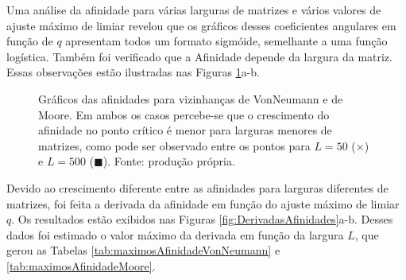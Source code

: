 \documentclass[
	12pt,				%
	openright,			%
	twoside,			%
	a4paper,			%
	english,			%
	french,				%
	spanish,			%
	brazil				%
	]{abntex2}
\begin{document}
Uma análise da afinidade para várias larguras de matrizes e vários valores de ajuste máximo de limiar revelou que os gráficos desses coeficientes angulares em função de $q$ apresentam todos um formato sigmóide, semelhante a uma função logística. Também foi verificado que a Afinidade depende da largura da matriz. Essas observações estão ilustradas nas Figuras \ref{fig:afinidades}a-b.
\begin{figure}
    \centering

    \caption{Gráficos das afinidades para vizinhanças de VonNeumann e de Moore. Em ambos os casos percebe-se que o crescimento do afinidade no ponto crítico é menor para larguras menores de matrizes, como pode ser observado entre os pontos para $L=50$ ($\times$) e $L=500$ ($\blacksquare$). Fonte: produção própria.}
    \label{fig:afinidades}
\end{figure}

Devido ao crescimento diferente entre as afinidades para larguras diferentes de matrizes, foi feita a derivada da afinidade em função do ajuste máximo de limiar $q$. Os resultados estão exibidos nas Figuras \ref{fig:DerivadasAfinidades}a-b. Desses dados foi estimado o valor máximo da derivada em função da largura $L$, que gerou as Tabelas \ref{tab:maximosAfinidadeVonNeumann} e \ref{tab:maximosAfinidadeMoore}.
\end{document}

